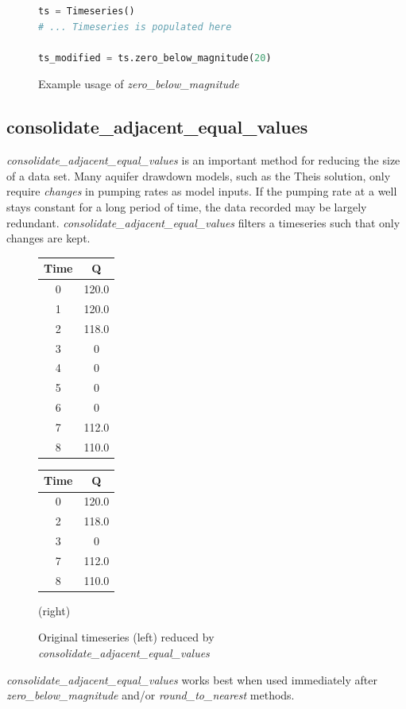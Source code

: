 \documentclass{book}
\begin{document}
\begin{figure}[H]
\begin{lstlisting}[language=python]
ts = Timeseries()
# ... Timeseries is populated here

ts_modified = ts.zero_below_magnitude(20)
\end{lstlisting}
\caption{Example usage of \emph{zero\_below\_magnitude}}
\end{figure}

\subsection{consolidate\_adjacent\_equal\_values}
\emph{consolidate\_adjacent\_equal\_values} is an important method for reducing
the size of a data set. Many aquifer drawdown models, such as the Theis solution, 
only require \emph{changes} in pumping rates as model inputs. If the pumping rate
at a well stays constant for a long period of time, the data recorded may be largely
redundant. \emph{consolidate\_adjacent\_equal\_values} filters a timeseries
such that only changes are kept. 

\begin{figure}[H]
\begin{tabular}{c c}
    \hline
    Time & Q \\ \hline
    0 & 120.0 \\
    1 & 120.0 \\
    2 & 118.0 \\
    3 & 0 \\
    4 & 0 \\
    5 & 0 \\
    6 & 0 \\
    7 & 112.0 \\
    8 & 110.0
\end{tabular}
\hspace{5cm} 
\begin{tabular}{c c}
    \hline
    Time & Q \\ \hline
    0 & 120.0 \\
    2 & 118.0 \\
    3 & 0 \\
    7 & 112.0 \\
    8 & 110.0
\end{tabular}
\caption{Original timeseries (left) reduced by 
\emph{consolidate\_adjacent\_equal\_values}} (right)
\end{figure}

\emph{consolidate\_adjacent\_equal\_values} works best when used immediately
after \emph{zero\_below\_magnitude} and/or \emph{round\_to\_nearest} methods.
\end{document}
